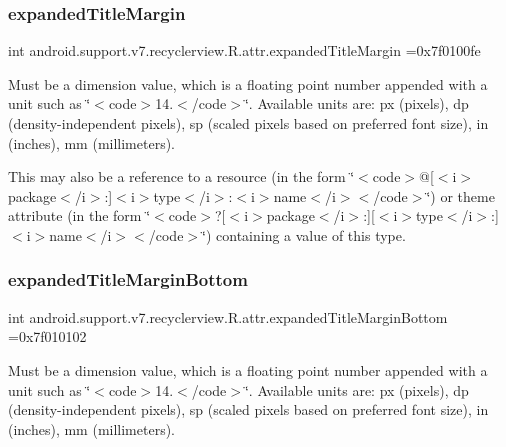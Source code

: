 \subsubsection{\texorpdfstring{expanded\+Title\+Margin}{expandedTitleMargin}}
{\footnotesize\ttfamily int android.\+support.\+v7.\+recyclerview.\+R.\+attr.\+expanded\+Title\+Margin =0x7f0100fe\hspace{0.3cm}{\ttfamily [static]}}

Must be a dimension value, which is a floating point number appended with a unit such as \char`\"{}$<$code$>$14.\+5sp$<$/code$>$\char`\"{}. Available units are\+: px (pixels), dp (density-\/independent pixels), sp (scaled pixels based on preferred font size), in (inches), mm (millimeters). 

This may also be a reference to a resource (in the form \char`\"{}$<$code$>$@\mbox{[}$<$i$>$package$<$/i$>$\+:\mbox{]}$<$i$>$type$<$/i$>$\+:$<$i$>$name$<$/i$>$$<$/code$>$\char`\"{}) or theme attribute (in the form \char`\"{}$<$code$>$?\mbox{[}$<$i$>$package$<$/i$>$\+:\mbox{]}\mbox{[}$<$i$>$type$<$/i$>$\+:\mbox{]}$<$i$>$name$<$/i$>$$<$/code$>$\char`\"{}) containing a value of this type. \mbox{\label{classandroid_1_1support_1_1v7_1_1recyclerview_1_1R_1_1attr_a99518f07bfbc14a31c398bdb1b9a873d}} 
\subsubsection{\texorpdfstring{expanded\+Title\+Margin\+Bottom}{expandedTitleMarginBottom}}
{\footnotesize\ttfamily int android.\+support.\+v7.\+recyclerview.\+R.\+attr.\+expanded\+Title\+Margin\+Bottom =0x7f010102\hspace{0.3cm}{\ttfamily [static]}}

Must be a dimension value, which is a floating point number appended with a unit such as \char`\"{}$<$code$>$14.\+5sp$<$/code$>$\char`\"{}. Available units are\+: px (pixels), dp (density-\/independent pixels), sp (scaled pixels based on preferred font size), in (inches), mm (millimeters). 

